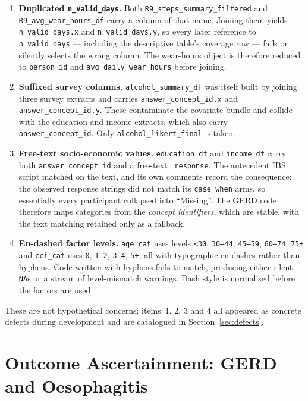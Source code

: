 \documentclass[11pt]{article}
\newcommand{\code}[1]{\texttt{\small #1}}
\begin{document}
\begin{enumerate}[leftmargin=1.5em,itemsep=3pt]
  \item \textbf{Duplicated \code{n_valid_days}.} Both \code{R9_steps_summary_filtered} and
  \code{R9_avg_wear_hours_df} carry a column of that name. Joining them yields
  \code{n_valid_days.x} and \code{n_valid_days.y}, so every later reference to \code{n_valid_days}
  --- including the descriptive table's coverage row --- fails or silently selects the wrong column.
  The wear-hours object is therefore reduced to \code{person_id} and \code{avg_daily_wear_hours}
  before joining.
  \item \textbf{Suffixed survey columns.} \code{alcohol_summary_df} was itself built by joining three
  survey extracts and carries \code{answer_concept_id.x} and \code{answer_concept_id.y}. These
  contaminate the covariate bundle and collide with the education and income extracts, which also
  carry \code{answer_concept_id}. Only \code{alcohol_likert_final} is taken.
  \item \textbf{Free-text socio-economic values.} \code{education_df} and \code{income_df} carry both
  \code{answer_concept_id} and a free-text \code{*_response}. The antecedent IBS script matched on the
  text, and its own comments record the consequence: the observed response strings did not match its
  \code{case_when} arms, so essentially every participant collapsed into ``Missing''. The GERD code
  therefore maps categories from the \emph{concept identifiers}, which are stable, with the text
  matching retained only as a fallback.
  \item \textbf{En-dashed factor levels.} \code{age_cat} uses levels \code{<30}, \code{30--44},
  \code{45--59}, \code{60--74}, \code{75+} and \code{cci_cat} uses \code{0}, \code{1--2}, \code{3--4},
  \code{5+}, all with typographic en-dashes rather than hyphens. Code written with hyphens fails to
  match, producing either silent \code{NA}s or a stream of level-mismatch warnings. Dash style is
  normalised before the factors are used.
\end{enumerate}

\noindent These are not hypothetical concerns; items~1, 2, 3 and 4 all appeared as concrete defects
during development and are catalogued in Section~\ref{sec:defects}.

\section{Outcome Ascertainment: GERD and Oesophagitis}
\end{document}

